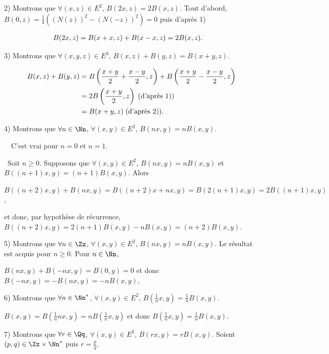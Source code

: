 {{2) Montrons que $\forall(x,z)\in E^2$, $B(2x,z) = 2B(x,z)$. Tout d'abord, $B(0,z)=\frac{1}{4}((N(z))^2-(N(-z))^2)=0$ puis d'après 1)

\begin{align*}\ensuremath
B(2x,z)&= B(x+x,z)+B(x-x,z) = 2B(x,z).
\end{align*}

3) Montrons que $\forall(x,y,z)\in E^3$, $B(x,z) + B(y,z) = B(x+y,z)$.

\begin{align*}\ensuremath
B(x,z) + B(y,z)&= B\left(\frac{x+y}{2}+\frac{x-y}{2},z\right)+ B\left(\frac{x+y}{2}-\frac{x-y}{2},z\right)\\
 &=2B\left(\frac{x+y}{2},z\right)\;(\text{d'après 1)})\\
 &= B(x+y,z)\;(\text{d'après 2)}).
\end{align*}

4) Montrons que $\forall n\in\Nn$, $\forall(x,y)\in E^2$, $B(nx,y) = nB(x,y)$.

\textbullet~~C'est vrai pour $n = 0$ et $n=1$.

\textbullet~Soit $n\geqslant0$. Supposons que $\forall(x,y)\in E^2$, $B(nx,y) = nB(x,y)$ et $B((n+1)x,y) = (n+1)B(x,y)$. Alors

\begin{center}
$B((n+2)x,y) + B(nx,y) = B((n+2)x+nx,y) = B(2(n+1)x,y) = 2B((n+1)x,y)$,
\end{center}

et donc, par hypothèse de récurrence, $B((n+2)x,y)=2(n+1)B(x,y)-nB(x,y) =(n+2)B(x,y)$.

5) Montrons que $\forall n\in\Zz$, $\forall(x,y)\in E^2$, $B(nx,y) = nB(x,y)$. Le résultat est acquis pour $n\geqslant 0$. Pour $n\in\Nn$,

\begin{center}
$B(nx,y) + B(-nx,y) = B(0,y) = 0$ et donc $B(-nx,y) =- B(nx,y)=-nB(x,y)$,
\end{center}

6) Montrons que $\forall n\in\Nn^*$, $\forall(x,y)\in E^2$, $B\left(\frac{1}{n}x,y\right) =\frac{1}{n}B(x,y)$.

\begin{center}
$B(x,y) =B\left(\frac{1}{n}nx,y\right) =nB\left(\frac{1}{n}x,y\right)$ et donc $B\left(\frac{1}{n}x,y\right) =\frac{1}{n}B(x,y)$.
\end{center}

7) Montrons que $\forall r\in\Qq$, $\forall(x,y)\in E^2$, $B(rx,y) = rB(x,y)$. Soient $(p,q)\in\Zz\times\Nn^*$ puis $r=\frac{p}{q}$.

}}
